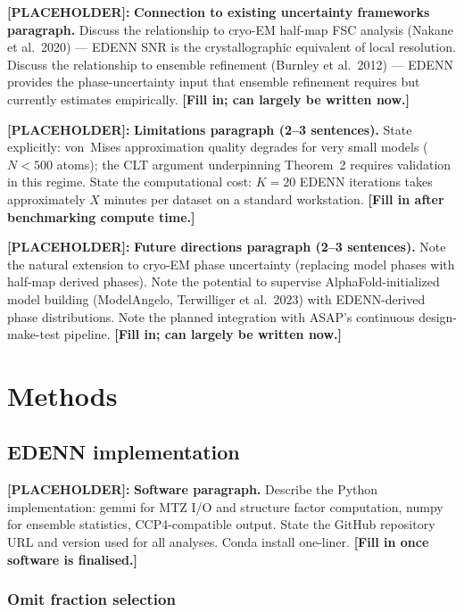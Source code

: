\documentclass[10pt,twocolumn]{article}
\newcommand{\placeholder}[1]{%
  \begin{mdframed}[
    linecolor=placeholder,linewidth=1pt,
    backgroundcolor=red!5,
    innertopmargin=6pt,innerbottommargin=6pt,
    innerleftmargin=8pt,innerrightmargin=8pt]
  \small\color{placeholder}\textbf{[PLACEHOLDER]:} #1
  \end{mdframed}
}
\begin{document}
\placeholder{
\textbf{Connection to existing uncertainty frameworks paragraph.}
Discuss the relationship to cryo-EM half-map FSC analysis
(Nakane et al.\ 2020) — EDENN SNR is the crystallographic
equivalent of local resolution.
Discuss the relationship to ensemble refinement (Burnley et al.\
2012) — EDENN provides the phase-uncertainty input that ensemble
refinement requires but currently estimates empirically.
\textbf{[Fill in; can largely be written now.]}
}

\placeholder{
\textbf{Limitations paragraph (2--3 sentences).}
State explicitly: von~Mises approximation quality degrades for very
small models ($N < 500$ atoms); the CLT argument underpinning
Theorem~2 requires validation in this regime.
State the computational cost: $K=20$ EDENN iterations takes
approximately $X$ minutes per dataset on a standard workstation.
\textbf{[Fill in after benchmarking compute time.]}
}

\placeholder{
\textbf{Future directions paragraph (2--3 sentences).}
Note the natural extension to cryo-EM phase uncertainty
(replacing model phases with half-map derived phases).
Note the potential to supervise AlphaFold-initialized model
building (ModelAngelo, Terwilliger et al.\ 2023) with
EDENN-derived phase distributions.
Note the planned integration with ASAP's continuous
design-make-test pipeline.
\textbf{[Fill in; can largely be written now.]}
}

\section{Methods}

\subsection{EDENN implementation}

\placeholder{
\textbf{Software paragraph.}
Describe the Python implementation: gemmi for MTZ I/O and structure
factor computation, numpy for ensemble statistics, CCP4-compatible
output.
State the GitHub repository URL and version used for all analyses.
Conda install one-liner.
\textbf{[Fill in once software is finalised.]}
}

\subsubsection{Omit fraction selection}
\end{document}
